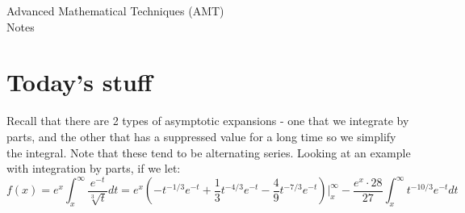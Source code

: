 \documentclass{article}
\begin{document}
\thispagestyle{fancy}
\begin{center}\LARGE{Advanced Mathematical Techniques (AMT) \\ Notes}\end{center}
\section{Today's stuff}
Recall that there are 2 types of asymptotic expansions - one that we integrate by parts, and the other that has a suppressed value for a long time so we simplify the integral. Note that these tend to be alternating series.
Looking at an example with integration by parts, if we let:
\[f(x) = e^x \int_{x}^{\infty}\frac{e^{-t}}{\sqrt[3] t}dt = e^x(-t^{-1/3}e^{-t}+\frac 1 3 t^{-4/3}e^{-t}-\frac49 t^{-7/3}e^{-t})\bigg| ^\infty_x - \frac{e^x \cdot 28}{27}\int_{x}^{\infty} t^{-10/3}e^{-t}dt\]
\end{document}
